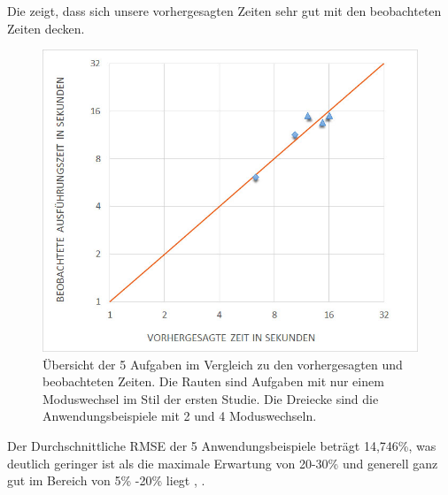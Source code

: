 Die  zeigt, dass sich unsere vorhergesagten Zeiten sehr gut mit den beobachteten Zeiten decken. 
\begin{figure}[ht]
	\centering
		\includegraphics[width=1\textwidth]{img/predictedVsObserveredData.jpg}
	\caption[Übersicht der 5 Aufgaben im Vergleich zu den vorhergesagten und beobachteten Zeiten]{Übersicht der 5 Aufgaben im Vergleich zu den vorhergesagten und beobachteten Zeiten. Die Rauten sind Aufgaben mit nur einem Moduswechsel im Stil der ersten Studie. Die Dreiecke sind die Anwendungsbeispiele mit 2 und 4 Moduswechseln.}
	\label{fig:predictedVsObserveredData}
\end{figure}

Der Durchschnittliche RMSE der 5 Anwendungsbeispiele beträgt 14,746\%, was deutlich geringer ist als die maximale Erwartung von 20-30\% \citep{Card_1980} und generell ganz gut im Bereich von 5\% -20\% liegt \citep{Luo_2005}, \citep{Teo:2006}. 

